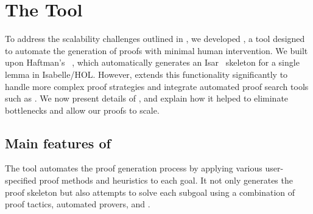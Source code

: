 \documentclass[10pt,conference]{IEEEtran}
\begin{document}
\section{The \supersketch{} Tool}\label{sec:supersketch}
To address the scalability challenges outlined in , 
we developed \supersketch{}, a tool designed to automate the generation of proofs with minimal human intervention. We built \supersketch{} upon Haftman's \sketch{}~\cite{sketch}, which automatically generates an Isar~\cite{Isar} skeleton for a single lemma in Isabelle/HOL. However, \supersketch{} extends this functionality significantly to handle more complex proof strategies and integrate automated proof search tools such as \sledgehammer{}.
We now present details of \supersketch{}, and explain how it helped to eliminate bottlenecks and allow our proofs to scale.


\subsection{Main features of \supersketch{}}
The tool automates the proof generation process by applying various user-specified proof methods and heuristics to each goal.
It not only generates the proof skeleton but also attempts to solve each subgoal using a combination of proof tactics, automated provers, and \sledgehammer{}. 
\end{document}
